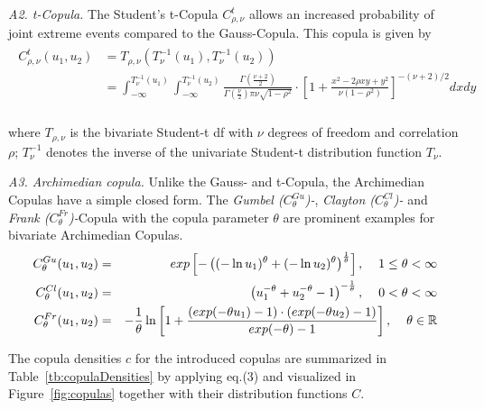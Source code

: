 \documentclass[a4paper]{article}
\begin{document}
\vspace*{0.2cm}
{\it A2. t-Copula.} The Student's t-Copula $C_{\rho,\nu}^t$ allows an increased probability of joint extreme events compared to the Gauss-Copula. This copula is given by
\begin{align}
	\begin{split}
		C_{\rho,\nu}^t(u_1,u_2)&=T_{\rho,\nu}\left(T_\nu^{-1}(u_1),T_\nu^{-1}(u_2)\right) \\
		&=\int_{-\infty}^{T_\nu^{-1}(u_1)} \int_{-\infty}^{T_\nu^{-1}(u_2)} \frac{\Gamma(\frac{\nu+2}{2})}{\Gamma(\frac{\nu}{2})\pi\nu\sqrt{1-\rho^2}} \cdot 
		 \left[1+\frac{x^2-2\rho x y + y^2}{\nu(1-\rho^2)} \right]^{-(\nu+2)/2} dxdy  \\
	\end{split}
\end{align}

where $T_{\rho,\nu}$ is the bivariate Student-t df with $\nu$ degrees of freedom and correlation $\rho$; $T_{\nu}^{-1}$ denotes the inverse of the univariate Student-t distribution function $T_{\nu}$.

\vspace*{0.2cm}
{\it A3. Archimedian copula.} Unlike the Gauss- and t-Copula, the Archimedian Copulas have a simple closed form. The {\it Gumbel ($C_\theta^{Gu}$)-}, {\it Clayton ($C_\theta^{Cl}$)-} and {\it Frank ($C_\theta^{Fr}$)-}Copula with the copula parameter $\theta$ are prominent examples for bivariate Archimedian Copulas.
\begin{eqnarray}
		C_\theta^{Gu}(u_1,u_2)&=&exp\left[-\left((-\ln u_1)^\theta+(-\ln u_2)^\theta\right)^{\frac{1}{\theta}}\right], \hspace{0.4cm} 1 \leq \theta < \infty  \\
		C_\theta^{Cl}(u_1,u_2)&=&\left(u_1^{-\theta}+u_2^{-\theta}-1\right)^{-\frac{1}{\theta}}, \hspace{0.4cm} 0 < \theta < \infty \\
		C_\theta^{Fr}(u_1,u_2)&=&-\frac{1}{\theta} \ln\left[1+\frac{(exp(-\theta u_1)-1) \cdot (exp(-\theta u_2)-1)}{exp(-\theta)-1}\right], \hspace{0.4cm}  \theta \in \mathbb{R}
\end{eqnarray}

The copula densities $c$ for the introduced copulas are summarized in Table~\ref{tb:copulaDensities} by applying eq.(3) and visualized in Figure~\ref{fig:copulas} together with their distribution functions $C$.
\end{document}
